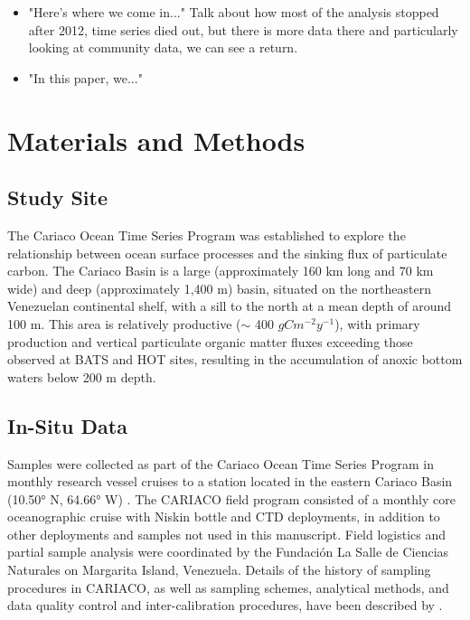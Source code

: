 \documentclass[draft]{agujournal2019}
\begin{document}
\begin{itemize}
        
        \item "Here's where we come in..." Talk about how most of the analysis stopped after 2012, time series died out, but there is more data there and particularly looking at community data, we can see a return.
    
        \item "In this paper, we..." 

        
    \end{itemize}


\section{Materials and Methods}
%
\subsection{Study Site}
    The Cariaco Ocean Time Series Program was established to explore the relationship between ocean surface processes and the sinking flux of particulate carbon. The Cariaco Basin is a large (approximately 160 km long and 70 km wide) and deep (approximately 1,400 m) basin, situated on the northeastern Venezuelan continental shelf, with a sill to the north at a mean depth of around 100 m. This area is relatively productive ($\sim$ 400 $g C m^{-2} y^{-1}$), with primary production and vertical particulate organic matter fluxes exceeding those observed at BATS and HOT sites, resulting in the accumulation of anoxic bottom waters below 200 m depth.

\subsection{In-Situ Data}
    Samples were collected as part of the Cariaco Ocean Time Series Program in monthly research vessel cruises to a station located in the eastern Cariaco Basin (10.50° N, 64.66° W) \cite{muller-karger_scientific_2019}.
    The CARIACO field program consisted of a monthly core oceanographic cruise with Niskin bottle and CTD deployments, in addition to other deployments and samples not used in this manuscript. Field logistics and partial sample analysis were coordinated by the Fundación La Salle de Ciencias Naturales on Margarita Island, Venezuela. Details of the history of sampling procedures in CARIACO, as well as sampling schemes, analytical methods, and data quality control and inter-calibration procedures, have been described by . 
    
\end{document}
